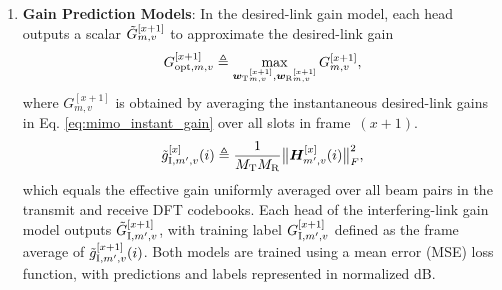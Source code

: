 \documentclass[conference, a4paper]{IEEEtran}
\newcommand{\rev}[1]{\textcolor{revisioncolor}{{}#1}}
\newif\ifshowdeletions
\newcommand{\currentdel}[1]{\ifshowdeletions\textcolor{deletioncolor}{\sout{#1}}\fi}
\theoremstyle{remark}
\begin{document}
\begin{enumerate}[label=\arabic*.]
    \item \textbf{Gain Prediction Models}: \currentdel{The channel-gain prediction is regarded as a regression task. For each micro BS–vehicle pair-$(m,v)$, we train two separate NN models with identical architecture but independent weights: one for the optimal desired-link gain and one for the interference-link gain.}
    In the desired-link \rev{gain }model, each head outputs a scalar $\Tilde{G}_{m,v}^{[x+1]}$ to approximate the \currentdel{frame-averaged optimal} desired-link gain
    \begin{equation}
        G_{{\rm opt},m,v}^{[x+1]}
        \triangleq
        \max_{{\bm{w}_{\rm T}}_{m,v}^{[x+1]},
              {\bm{w}_{\rm R}}_{m,v}^{[x+1]}} G_{m,v}^{[x+1]},
    \end{equation}
    where $G_{m,v}^{[x+1]}$ is obtained by averaging the instantaneous desired-link gains in Eq. \eqref{eq:mimo_instant_gain} over all slots in frame~$(x\!+\!1)$.
    \currentdel{The interference-link model is similarly defined: its final layer outputs a scalar $\Tilde{G}_{{\rm I},m,v}^{[x+1]}$ with label $G_{{\rm I},m,v}^{[x+1]}$, given by the frame-average of the instantaneous interference-link gains in Eq. \mbox{\eqref{eq:mimo_instant_gain_interference}}.}
    {\color{revisioncolor}
    \begin{equation}
        \label{eq:mimo_average_gain_interference}
        \tilde{g}_{{\rm I},m',v}^{[x]}(i)
        \triangleq \frac{1}{M_{\rm T}M_{\rm R}}
        \bigl\|\boldsymbol H_{m',v}^{[x]}(i)\bigr\|_F^2,
    \end{equation}
    }\rev{which equals the effective gain uniformly averaged over all beam pairs in the transmit and receive DFT codebooks. Each head of the interfering-link gain model outputs $\Tilde{G}_{{\rm I},m',v}^{[x+1]}$, with training label $G_{{\rm I},m',v}^{[x+1]}$ defined as the frame average of $\tilde{g}_{{\rm I},m',v}^{[x+1]}(i)$.}
    Both models are trained using a mean \currentdel{square} error (MSE) loss function, with predictions and labels represented in normalized dB.
\end{enumerate}
\end{document}
